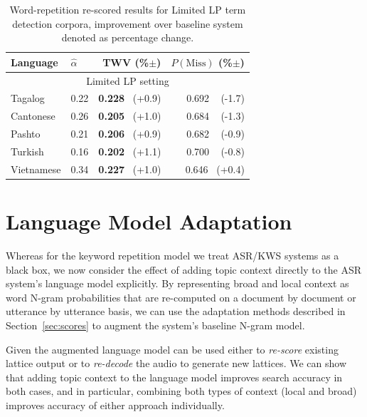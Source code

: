 \begin{table}
\centering
\begin{tabular}{l|l|r|r} \toprule
\bf Language & \bf $\widehat{\alpha}$ & \bf TWV (\%$\pm$) & \bf $P(\mathrm{Miss})$ (\%$\pm$) \\\midrule
\multicolumn{4}{c}{Limited LP setting} \\\midrule
Tagalog & 0.22 & \textbf{ 0.228} $\,$ (+0.9) & 0.692 $\,\,\,$ (-1.7)\\
Cantonese & 0.26 & \textbf{0.205} $\,$ (+1.0) & 0.684 $\,\,\,$ (-1.3) \\
Pashto & 0.21 & \textbf{0.206 }$\,$ (+0.9) & 0.682 $\,\,\,$ (-0.9) \\
Turkish & 0.16 & \textbf{0.202} $\,$ (+1.1) & 0.700 $\,\,\,$ (-0.8) \\
Vietnamese & 0.34 & \textbf{0.227} $\,$ (+1.0) & 0.646 $\,$ (+0.4) \\
\bottomrule
\end{tabular}
\caption[Word-repetition re-scored results]{Word-repetition re-scored results for Limited LP term detection corpora, improvement over baseline system denoted as percentage change. 
\label{fig4:LimitedLP} }
\end{table}


\section{Language Model Adaptation}

Whereas for the keyword repetition model we treat ASR/KWS systems as a black box, we now consider the effect of adding topic context directly to the ASR system's language model explicitly.  By representing broad and local context as word N-gram probabilities that are re-computed on a document by document or utterance by utterance basis, we can use the adaptation methods described in Section~\ref{sec:scores} to augment the system's baseline N-gram model. 

Given the augmented language model can be used either to \textit{re-score} existing lattice output or to \textit{re-decode} the audio to generate new lattices.  We can show that adding topic context to the language model improves search accuracy in both cases, and in particular, combining both types of context (local and broad) improves accuracy of either approach individually.

